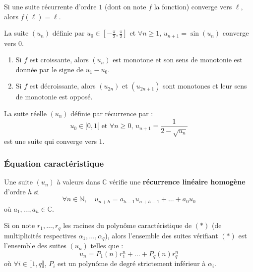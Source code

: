 	\begin{corollary}
		Si une suite récurrente d'ordre $1$ (dont on note $f$ la fonction) converge vers $\ell$, alors $f(\ell) = \ell$.
	\end{corollary}
	
	\begin{example}
		La suite $(u_n)$ définie par $u_0 \in \left[ -\frac{\pi}{2}, \frac{\pi}{2} \right]$ et $\forall n \geq 1, \, u_{n+1} = \sin(u_n)$ converge vers $0$.
	\end{example}
	
	
	\begin{proposition}
		\begin{enumerate}[label=(\roman*)]
			\item Si $f$ est croissante, alors $(u_n)$ est monotone et son sens de monotonie est donnée par le signe de $u_1 - u_0$.
			\item Si $f$ est décroissante, alors $(u_{2n})$ et $(u_{2n+1})$ sont monotones et leur sens de monotonie est opposé.
		\end{enumerate}
	\end{proposition}
	
	\begin{example}
		La suite réelle $(u_n)$ définie par récurrence par :
		\[ u_0 \in [0, 1[ \text{ et } \forall n \geq 0, \, u_{n+1} = \frac{1}{2 - \sqrt{u_n}} \]
		est une suite qui converge vers $1$.
	\end{example}
	
	\subsubsection{Équation caractéristique}
	
	\begin{definition}
		Une suite $(u_n)$ à valeurs dans $\mathbb{C}$ vérifie une \textbf{récurrence linéaire homogène} d'ordre $h$ si
		\[ \forall n \in \mathbb{N}, \quad u_{n+h} = a_{h-1} u_{n+h-1} + \dots + a_0 u_0 \tag{$*$} \]
		où $a_1, \dots, a_h \in \mathbb{C}$.
	\end{definition}
	
	\begin{proposition}
		Si on note $r_1, \dots, r_q$ les racines du polynôme caractéristique de $(*)$ (de multiplicités respectives $\alpha_1, \dots, \alpha_q$), alors l'ensemble des suites vérifiant $(*)$ est l'ensemble des suites $(u_n)$ telles que :
		\[ u_n = P_1(n) r_1^n + \dots + P_q(n) r_q^n \]
		où $\forall i \in \llbracket 1, q \rrbracket$, $P_i$ est un polynôme de degré strictement inférieur à $\alpha_i$.
	\end{proposition}
	
